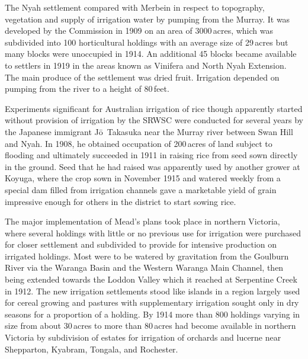 The Nyah settlement compared with Merbein in respect to topography,
vegetation and supply of irrigation water by pumping from the Murray.
It was developed by the Commission in 1909 on an area of 3000\,acres,
which was subdivided into 100 horticultural holdings with an average
size of 29\,acres but many blocks were unoccupied in 1914. An
additional 45 blocks became available to settlers in 1919 in the areas
known as Vinifera and North Nyah Extension.  The main produce of the
settlement was dried fruit.  Irrigation depended on pumping from the
river to a height of 80\,feet.

Experiments significant for Australian irrigation of rice though
apparently started without provision of irrigation by the SRWSC were
conducted for several years by the Japanese immigrant
J{\={o}}~Takasuka  near the Murray river between
Swan Hill and Nyah.  In 1908, he obtained occupation of 200\,acres of
land subject to flooding and ultimately succeeded in 1911 in raising
rice from seed sown directly in the ground.  Seed that he had raised
was apparently used by another grower at Koyuga, where the crop sown
in November 1915 and watered weekly from a special dam filled from
irrigation channels gave a marketable yield of grain impressive enough
for others in the district to start sowing
rice.

The major implementation of Mead's plans took place in northern
Victoria, where several holdings with little or no previous use for
irrigation were purchased for closer settlement and subdivided to
provide for intensive production on irrigated holdings.  Most were to
be watered by gravitation from the Goulburn River via the Waranga
Basin and the Western Waranga Main Channel, then being extended
towards the Loddon Valley which it reached at Serpentine Creek
 in 1912.  The new irrigation settlements stood
like islands in a region largely used for cereal growing and pastures
with supplementary irrigation sought only in dry seasons for a
proportion of a holding.  By 1914 more than 800 holdings varying in
size from about 30\,acres to more than 80\,acres had become available
in northern Victoria by subdivision of estates for irrigation of
orchards and lucerne near Shepparton, Kyabram, Tongala, and
Rochester.

